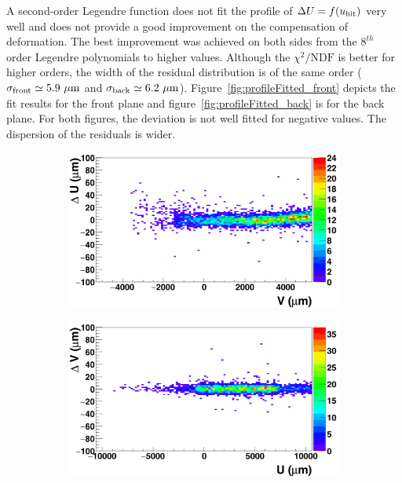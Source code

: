  
      A second-order Legendre function does not fit the profile of $\Delta U=f(u_{\rm{hit}})$ very well and does not provide a good improvement on the compensation of deformation.
      The best improvement was achieved on both sides from the $8^{th}$ order Legendre polynomials to higher values.
      Although the $\chi^2 \text{/NDF}$ is better for higher orders, the width of the residual distribution is of the same order ($\sigma_{\rm{front}}\simeq 5.9~\rm{\mu m}$ and $\sigma_{\rm{back}} \simeq 6.2~\rm{\mu m}$).
      Figure~\ref{fig:profileFitted_front} depicts the fit results for the front plane and figure~\ref{fig:profileFitted_back} is for the back plane.
      For both figures, the deviation is not well fitted for negative values.
      The dispersion of the residuals is wider. 

\begin{figure}[!tbh]
        \centering
        \begin{subfigure}[t]{0.45\textwidth}
        \centering
          \includegraphics[width = 1.2\textwidth]{Pictures/deformation/deltaUV_8_corrected1.png}
          \caption{}
          \label{fig:scatterDUV_corrected_front}
        \end{subfigure}
        \hfill
        \begin{subfigure}[t]{0.45\textwidth}
          \centering
          \includegraphics[width = 1.2\textwidth]{Pictures/deformation/deltaVU_8_corrected1.png}
          \caption{}
          \label{fig:scatterDVU_corrected}
        \end{subfigure}


\end{figure}
